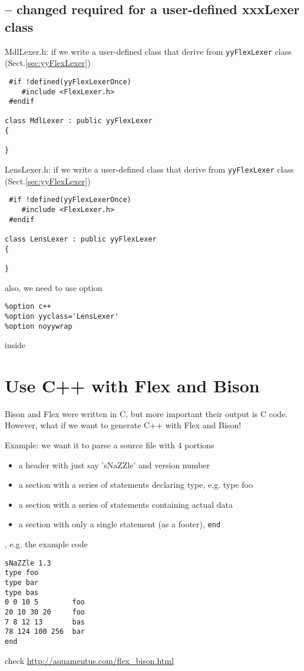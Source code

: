 \subsection{-- changed required for a user-defined xxxLexer class}


MdlLexer.h: if we write a user-defined class that derive from \verb!yyFlexLexer! class (Sect.\ref{sec:yyFlexLexer})
\begin{verbatim}
 #if !defined(yyFlexLexerOnce)
    #include <FlexLexer.h>
 #endif

class MdlLexer : public yyFlexLexer
{

}
\end{verbatim}

LensLexer.h: if we write a user-defined class that derive from \verb!yyFlexLexer! class (Sect.\ref{sec:yyFlexLexer})
\begin{verbatim}
 #if !defined(yyFlexLexerOnce)
    #include <FlexLexer.h>
 #endif

class LensLexer : public yyFlexLexer
{

}
\end{verbatim}

also, we need to use option 
\begin{verbatim}
%option c++
%option yyclass='LensLexer'
%option noyywrap
\end{verbatim}
inside 

\section{Use C++ with Flex and Bison}
\label{sec:example-Flex-Bison-C++}

Bison and Flex were written in C, but more important their output is C code.
However, what if we want to generate C++ with Flex and Bison!

Example: we want it to parse a source file with 4 portions
\begin{itemize}
  \item a header with just say 'sNaZZle' and version number
  \item a section with a series of statements declaring type, e.g. type foo
  \item a section with a series of statements containing actual data
  \item a section with only a single statement (as a footer), \verb!end!
\end{itemize}
, e.g. the example
code
\begin{verbatim}
sNaZZle 1.3
type foo
type bar
type bas
0 0 10 5        foo
20 10 30 20     foo
7 8 12 13       bas
78 124 100 256  bar
end
\end{verbatim}
check \url{http://aquamentus.com/flex_bison.html}


